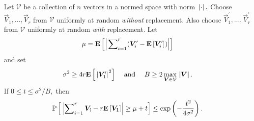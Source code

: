 \begin{lemma}
 \label{lemma:vector-bernstein}
  Let $\mathcal{V}$ be a collection of $n$ vectors in a normed space with norm $\mbox{}\left|\cdot\right|.$ Choose $\vec{V}_1, \ldots, \vec{V}_r$ from $\mathcal{V}$ uniformly at random \emph{without} replacement. Also choose $\vec{V}_1^\prime, \ldots, \vec{V}_r^\prime$ from $\mathcal{V}$ uniformly at random \emph{with} replacement. Let
\[
 \mu = {{\mathbf E}\left[\mbox{}\left|\sum\nolimits_{i=1}^r (\bm{V}_i^\prime - {{\mathbf E}\left[\bm{V}_i^\prime\right]})\right|\right]}
\]
and set
\[
\sigma^2 \geq 4r{{\mathbf E}\left[\mbox{}\left|\bm{V}_1^\prime\right|^2\right]} \quad \text{ and } \quad B \geq 2 \max_{\bm{V} \in \mathcal{V}} \mbox{}\left|\bm{V}\right|.
\]
If $ 0 \leq t \leq \sigma^2/B,$ then
\[
 \mbox{}{\mathbb{P}}\left[\mbox{}\left|\sum\nolimits_{i=1}^r \bm{V}_i - r{{\mathbf E}\left[\bm{V}_1\right]}\right| \geq \mu+t\right] \leq \mathrm{exp}\left( -{t^2\over 4 \sigma^2} \right).
\]
\end{lemma}


